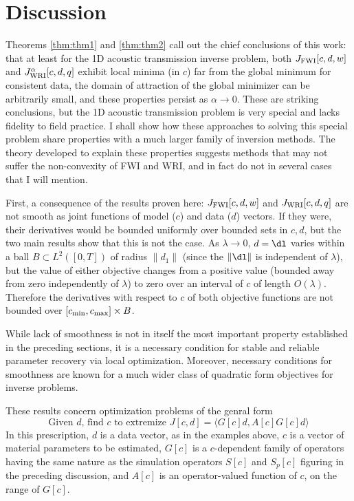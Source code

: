 \section{Discussion}
Theorems \ref{thm:thm1} and \ref{thm:thm2} call out the chief
conclusions of this work: that at least for the 1D acoustic
transmission inverse problem, both $J_{\rm FWI}[c,d,w]$ and
$J_{\rm WRI}^{\alpha}[c,d,q]$ exhibit local minima (in $c$) far from the global
minimum for consistent data, the domain of attraction of the
global minimizer can be arbitrarily small, and these properties
persist as $\alpha \rightarrow 0$. These are striking
conclusions, but the 1D acoustic transmission problem is very special
and lacks fidelity to field practice. I shall show how these
approaches to solving this special problem share properties with a
much larger family of inversion methods. The theory developed to
explain these properties suggests methods that may not suffer the
non-convexity of FWI and WRI, and in fact do not in several cases that
I will mention. 

First, a consequence of the results proven here: $J_{\rm FWI}[c,d,w]$
and $J_{\rm WRI}[c,d,q]$ are not smooth as joint functions of model
($c$) and data ($d$) vectors. If they were, their derivatives would be
bounded uniformly over bounded sets in $c,d$, but the two main results
show that this is not the case. As $\lambda \rightarrow 0$, $d=\dl$
varies within a ball $B \subset L^2([0,T])$ of radius $\|d_1\|$ (since
the $\|\dl\|$ is independent of $\lambda$), but the value of either
objective changes from a positive value (bounded away from zero
independently of $\lambda$) to zero over an interval of $c$ of length
$O(\lambda)$. Therefore the derivatives with respect to $c$ of both
objective functions are not bounded over
$[c_{\rm min},c_{\rm max}] \times B$.

While lack of smoothness is not in itself the most important property
established in the preceding sections, it is a necessary condition for
stable and reliable parameter recovery via local
optimization. Moreover, necessary conditions for smoothness are
known for a much wider class of quadratic form objectives for inverse
problems. 
  
These results
concern optimization problems of the genral form
\begin{equation}
  \label{eqn:gen1}
  \mbox{Given }d\mbox{, find }c\mbox{ to extremize }
   J[c,d] = \langle G[c]d, A[c] G[c]d \rangle
\end{equation}
In this prescription, $d$ is a data vector, as in the examples above,
$c$ is a vector of material parameters to be estimated, $G[c]$ is a
$c$-dependent family of operators having the same nature as the
simulation operators $S[c]$ and $S_p[c]$ figuring in the preceding
discussion, and $A[c]$ is an operator-valued function of $c$, on the range
of $G[c]$.

